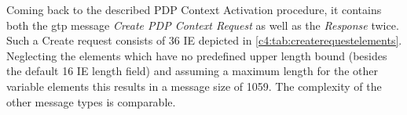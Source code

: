 \begin{table}[htbp]
\begin{tabu}
		\bottomrule
	\end{tabu}%
\end{table}



Coming back to the described \gls{PDP} Context Activation procedure, it contains both the \gls{gtp} message \textit{Create \gls{PDP} Context Request} as well as the \textit{Response} twice. Such a Create request consists of 36 \gls{IE} depicted in \ref{c4:tab:createrequestelements}. Neglecting the elements which have no predefined upper length bound (besides the default \SI{16}{\bit} \gls{IE} length field) and assuming a maximum length for the other variable elements this results in a message size of \SI{1059}{\byte}. The complexity of the other message types is comparable.

